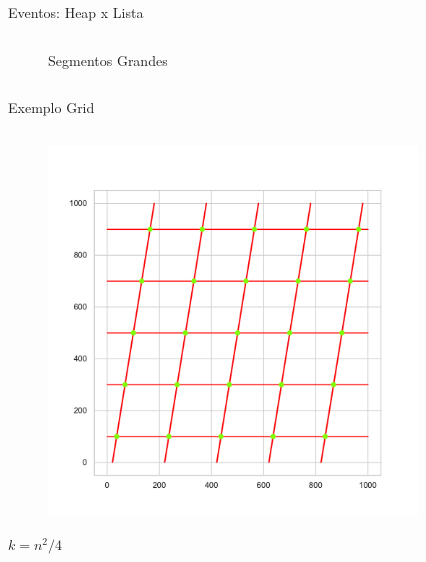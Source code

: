 \documentclass[aspectratio=169,usenames,dvipsnames]{beamer}
\begin{document}
\begin{frame}{ Eventos: Heap x Lista}
\begin{columns}
\begin{column}{0.4\textwidth}
\begin{figure}
        \caption{Segmentos Grandes}
      \end{figure}
    \end{column}
  \end{columns}
 

\end{frame}


\begin{frame}{Exemplo Grid}
  \begin{columns}
    \begin{column}{0.35\textwidth}
      \begin{figure}
        \includegraphics[width=\textwidth]{figs/exemplos/grid_example_10_interserctions.pdf}
      \end{figure}
      $k = n^2/4$
    \end{column}
    \begin{column}{0.65\textwidth}
      \begin{figure}

\end{figure}
\end{column}
\end{columns}
\end{frame}
\end{document}
